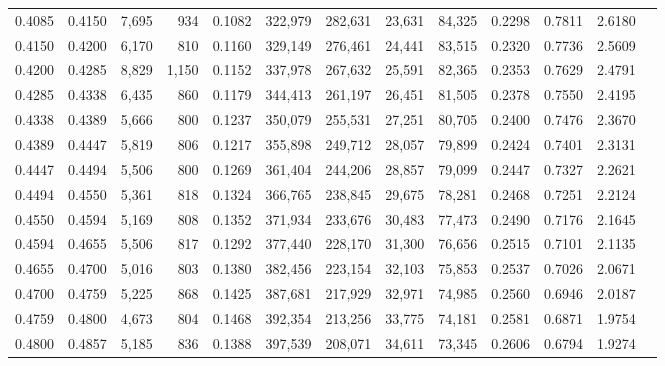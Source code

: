 \begin{tabular}{rrrrrrrrrrrrr}
0.4085 & 0.4150 &  7,695 &   934 &                                     0.1082 & 322,979 & 282,631 &  23,631 &  84,325 & 0.2298 & 0.7811 & 2.6180 \\
0.4150 & 0.4200 &  6,170 &   810 &                                     0.1160 & 329,149 & 276,461 &  24,441 &  83,515 & 0.2320 & 0.7736 & 2.5609 \\
0.4200 & 0.4285 &  8,829 & 1,150 &                                     0.1152 & 337,978 & 267,632 &  25,591 &  82,365 & 0.2353 & 0.7629 & 2.4791 \\
0.4285 & 0.4338 &  6,435 &   860 &                                     0.1179 & 344,413 & 261,197 &  26,451 &  81,505 & 0.2378 & 0.7550 & 2.4195 \\
0.4338 & 0.4389 &  5,666 &   800 &                                     0.1237 & 350,079 & 255,531 &  27,251 &  80,705 & 0.2400 & 0.7476 & 2.3670 \\
0.4389 & 0.4447 &  5,819 &   806 &                                     0.1217 & 355,898 & 249,712 &  28,057 &  79,899 & 0.2424 & 0.7401 & 2.3131 \\
0.4447 & 0.4494 &  5,506 &   800 &                                     0.1269 & 361,404 & 244,206 &  28,857 &  79,099 & 0.2447 & 0.7327 & 2.2621 \\
0.4494 & 0.4550 &  5,361 &   818 &                                     0.1324 & 366,765 & 238,845 &  29,675 &  78,281 & 0.2468 & 0.7251 & 2.2124 \\
0.4550 & 0.4594 &  5,169 &   808 &                                     0.1352 & 371,934 & 233,676 &  30,483 &  77,473 & 0.2490 & 0.7176 & 2.1645 \\
0.4594 & 0.4655 &  5,506 &   817 &                                     0.1292 & 377,440 & 228,170 &  31,300 &  76,656 & 0.2515 & 0.7101 & 2.1135 \\
0.4655 & 0.4700 &  5,016 &   803 &                                     0.1380 & 382,456 & 223,154 &  32,103 &  75,853 & 0.2537 & 0.7026 & 2.0671 \\
0.4700 & 0.4759 &  5,225 &   868 &                                     0.1425 & 387,681 & 217,929 &  32,971 &  74,985 & 0.2560 & 0.6946 & 2.0187 \\
0.4759 & 0.4800 &  4,673 &   804 &                                     0.1468 & 392,354 & 213,256 &  33,775 &  74,181 & 0.2581 & 0.6871 & 1.9754 \\
0.4800 & 0.4857 &  5,185 &   836 &                                     0.1388 & 397,539 & 208,071 &  34,611 &  73,345 & 0.2606 & 0.6794 & 1.9274 \\

\end{tabular}
